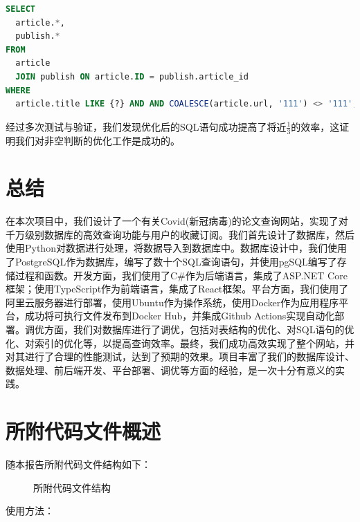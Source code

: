 \documentclass[UTF8,openany]{ctexbook}
\begin{document}
\begin{lstlisting}[language=sql]
SELECT
  article.*,
  publish.* 
FROM
  article
  JOIN publish ON article.ID = publish.article_id 
WHERE
  article.title LIKE {?} AND AND COALESCE(article.url, '111') <> '111';
\end{lstlisting}

经过多次测试与验证，我们发现优化后的SQL语句成功提高了将近$\frac{1}{3}$的效率，这证明我们对非空判断的优化工作是成功的。

\chapter{总结}
\label{sec:conclusion}

在本次项目中，我们设计了一个有关Covid(新冠病毒)的论文查询网站，实现了对千万级别数据库的高效查询功能与用户的收藏订阅。我们首先设计了数据库，然后使用Python对数据进行处理，将数据导入到数据库中。数据库设计中，我们使用了PostgreSQL作为数据库，编写了数十个SQL查询语句，并使用pgSQL编写了存储过程和函数。开发方面，我们使用了C\#作为后端语言，集成了ASP.NET Core框架；使用TypeScript作为前端语言，集成了React框架。平台方面，我们使用了阿里云服务器进行部署，使用Ubuntu作为操作系统，使用Docker作为应用程序平台，成功将可执行文件发布到Docker Hub，并集成Github Actions实现自动化部署。调优方面，我们对数据库进行了调优，包括对表结构的优化、对SQL语句的优化、对索引的优化等，以提高查询效率。最终，我们成功高效实现了整个网站，并对其进行了合理的性能测试，达到了预期的效果。项目丰富了我们的数据库设计、数据处理、前后端开发、平台部署、调优等方面的经验，是一次十分有意义的实践。

\newpage

\appendix

\chapter{所附代码文件概述}
\label{appendix:code}

随本报告所附代码文件结构如下：

\begin{figure}[H]
  \caption{所附代码文件结构}
  \label{fig:processData}
\end{figure}

使用方法：
\end{document}
